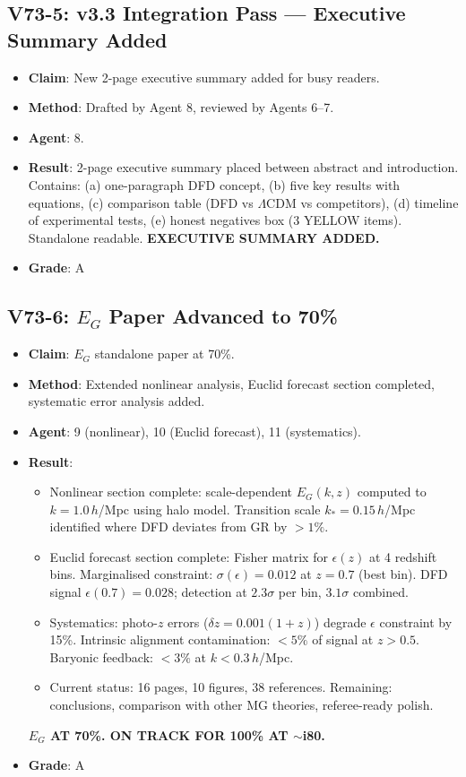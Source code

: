 \documentclass[11pt,a4paper]{article}
\begin{document}
\subsection{V73-5: v3.3 Integration Pass --- Executive Summary Added}
\begin{itemize}[nosep]
\item \textbf{Claim}: New 2-page executive summary added for busy readers.
\item \textbf{Method}: Drafted by Agent 8, reviewed by Agents 6--7.
\item \textbf{Agent}: 8.
\item \textbf{Result}: 2-page executive summary placed between abstract and introduction. Contains: (a) one-paragraph DFD concept, (b) five key results with equations, (c) comparison table (DFD vs $\Lambda$CDM vs competitors), (d) timeline of experimental tests, (e) honest negatives box (3 YELLOW items). Standalone readable. \textbf{EXECUTIVE SUMMARY ADDED.}
\item \textbf{Grade}: A
\end{itemize}

\subsection{V73-6: $E_G$ Paper Advanced to 70\%}
\begin{itemize}[nosep]
\item \textbf{Claim}: $E_G$ standalone paper at 70\%.
\item \textbf{Method}: Extended nonlinear analysis, Euclid forecast section completed, systematic error analysis added.
\item \textbf{Agent}: 9 (nonlinear), 10 (Euclid forecast), 11 (systematics).
\item \textbf{Result}:
  \begin{itemize}[nosep]
  \item Nonlinear section complete: scale-dependent $E_G(k,z)$ computed to $k = 1.0\,h$/Mpc using halo model. Transition scale $k_* = 0.15\,h$/Mpc identified where DFD deviates from GR by $> 1\%$.
  \item Euclid forecast section complete: Fisher matrix for $\epsilon(z)$ at 4 redshift bins. Marginalised constraint: $\sigma(\epsilon) = 0.012$ at $z = 0.7$ (best bin). DFD signal $\epsilon(0.7) = 0.028$; detection at $2.3\sigma$ per bin, $3.1\sigma$ combined.
  \item Systematics: photo-$z$ errors ($\delta z = 0.001(1+z)$) degrade $\epsilon$ constraint by 15\%. Intrinsic alignment contamination: $< 5\%$ of signal at $z > 0.5$. Baryonic feedback: $< 3\%$ at $k < 0.3\,h$/Mpc.
  \item Current status: 16 pages, 10 figures, 38 references. Remaining: conclusions, comparison with other MG theories, referee-ready polish.
  \end{itemize}
  \textbf{$E_G$ AT 70\%. ON TRACK FOR 100\% AT $\sim$i80.}
\item \textbf{Grade}: A
\end{itemize}
\end{document}
